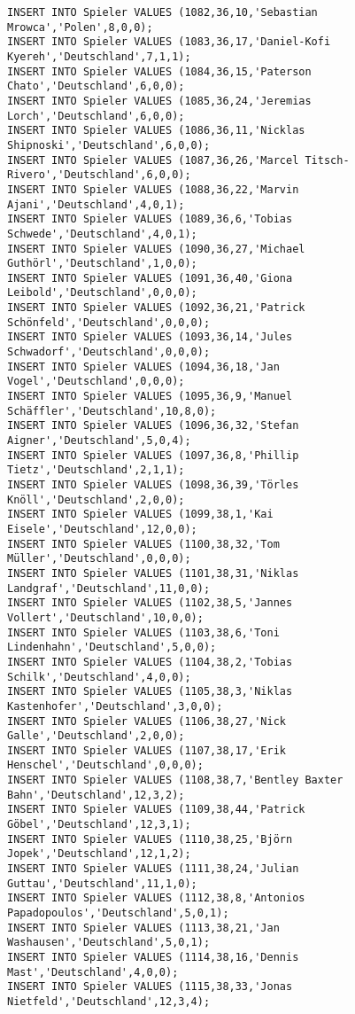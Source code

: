 \documentclass{bschlangaul-aufgabe}
\begin{document}
\begin{verbatim}
INSERT INTO Spieler VALUES (1082,36,10,'Sebastian Mrowca','Polen',8,0,0);
INSERT INTO Spieler VALUES (1083,36,17,'Daniel-Kofi Kyereh','Deutschland',7,1,1);
INSERT INTO Spieler VALUES (1084,36,15,'Paterson Chato','Deutschland',6,0,0);
INSERT INTO Spieler VALUES (1085,36,24,'Jeremias Lorch','Deutschland',6,0,0);
INSERT INTO Spieler VALUES (1086,36,11,'Nicklas Shipnoski','Deutschland',6,0,0);
INSERT INTO Spieler VALUES (1087,36,26,'Marcel Titsch-Rivero','Deutschland',6,0,0);
INSERT INTO Spieler VALUES (1088,36,22,'Marvin Ajani','Deutschland',4,0,1);
INSERT INTO Spieler VALUES (1089,36,6,'Tobias Schwede','Deutschland',4,0,1);
INSERT INTO Spieler VALUES (1090,36,27,'Michael Guthörl','Deutschland',1,0,0);
INSERT INTO Spieler VALUES (1091,36,40,'Giona Leibold','Deutschland',0,0,0);
INSERT INTO Spieler VALUES (1092,36,21,'Patrick Schönfeld','Deutschland',0,0,0);
INSERT INTO Spieler VALUES (1093,36,14,'Jules Schwadorf','Deutschland',0,0,0);
INSERT INTO Spieler VALUES (1094,36,18,'Jan Vogel','Deutschland',0,0,0);
INSERT INTO Spieler VALUES (1095,36,9,'Manuel Schäffler','Deutschland',10,8,0);
INSERT INTO Spieler VALUES (1096,36,32,'Stefan Aigner','Deutschland',5,0,4);
INSERT INTO Spieler VALUES (1097,36,8,'Phillip Tietz','Deutschland',2,1,1);
INSERT INTO Spieler VALUES (1098,36,39,'Törles Knöll','Deutschland',2,0,0);
INSERT INTO Spieler VALUES (1099,38,1,'Kai Eisele','Deutschland',12,0,0);
INSERT INTO Spieler VALUES (1100,38,32,'Tom Müller','Deutschland',0,0,0);
INSERT INTO Spieler VALUES (1101,38,31,'Niklas Landgraf','Deutschland',11,0,0);
INSERT INTO Spieler VALUES (1102,38,5,'Jannes Vollert','Deutschland',10,0,0);
INSERT INTO Spieler VALUES (1103,38,6,'Toni Lindenhahn','Deutschland',5,0,0);
INSERT INTO Spieler VALUES (1104,38,2,'Tobias Schilk','Deutschland',4,0,0);
INSERT INTO Spieler VALUES (1105,38,3,'Niklas Kastenhofer','Deutschland',3,0,0);
INSERT INTO Spieler VALUES (1106,38,27,'Nick Galle','Deutschland',2,0,0);
INSERT INTO Spieler VALUES (1107,38,17,'Erik Henschel','Deutschland',0,0,0);
INSERT INTO Spieler VALUES (1108,38,7,'Bentley Baxter Bahn','Deutschland',12,3,2);
INSERT INTO Spieler VALUES (1109,38,44,'Patrick Göbel','Deutschland',12,3,1);
INSERT INTO Spieler VALUES (1110,38,25,'Björn Jopek','Deutschland',12,1,2);
INSERT INTO Spieler VALUES (1111,38,24,'Julian Guttau','Deutschland',11,1,0);
INSERT INTO Spieler VALUES (1112,38,8,'Antonios Papadopoulos','Deutschland',5,0,1);
INSERT INTO Spieler VALUES (1113,38,21,'Jan Washausen','Deutschland',5,0,1);
INSERT INTO Spieler VALUES (1114,38,16,'Dennis Mast','Deutschland',4,0,0);
INSERT INTO Spieler VALUES (1115,38,33,'Jonas Nietfeld','Deutschland',12,3,4);

\end{verbatim}
\end{document}
